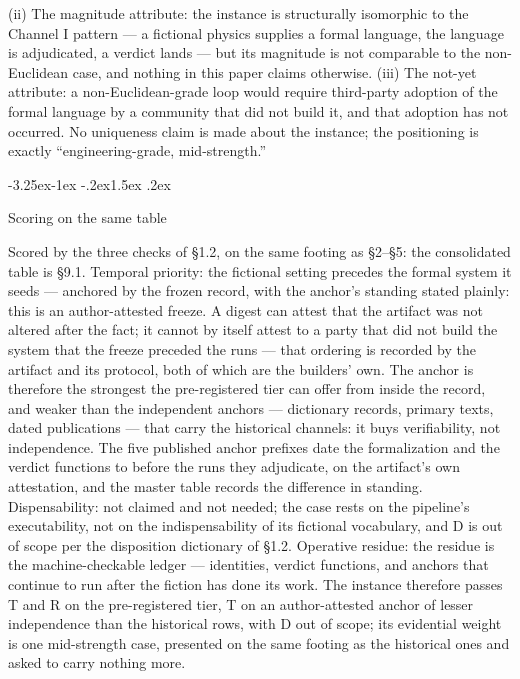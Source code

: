 \documentclass[11pt,a4paper]{article}
\makeatletter
\renewcommand\subsection{\@startsection{subsection}{2}{\z@}%
  {-3.25ex\@plus -1ex \@minus -.2ex}{1.5ex \@plus .2ex}%
  {\normalfont\large\bfseries\raggedright}}
\makeatother
\begin{document}
(ii) The magnitude attribute: the instance is structurally isomorphic to the Channel I pattern — a fictional physics supplies a formal language, the language is adjudicated, a verdict lands — but its magnitude is not comparable to the non-Euclidean case, and nothing in this paper claims otherwise. (iii) The not-yet attribute: a non-Euclidean-grade loop would require third-party adoption of the formal language by a community that did not build it, and that adoption has not occurred. No uniqueness claim is made about the instance; the positioning is exactly ``engineering-grade, mid-strength.''

\subsection{Scoring on the same table}

Scored by the three checks of §1.2, on the same footing as §2–§5: the consolidated table is §9.1. Temporal priority: the fictional setting precedes the formal system it seeds — anchored by the frozen record, with the anchor's standing stated plainly: this is an author-attested freeze. A digest can attest that the artifact was not altered after the fact; it cannot by itself attest to a party that did not build the system that the freeze preceded the runs — that ordering is recorded by the artifact and its protocol, both of which are the builders' own. The anchor is therefore the strongest the pre-registered tier can offer from inside the record, and weaker than the independent anchors — dictionary records, primary texts, dated publications — that carry the historical channels: it buys verifiability, not independence. The five published anchor prefixes date the formalization and the verdict functions to before the runs they adjudicate, on the artifact's own attestation, and the master table records the difference in standing. Dispensability: not claimed and not needed; the case rests on the pipeline's executability, not on the indispensability of its fictional vocabulary, and D is out of scope per the disposition dictionary of §1.2. Operative residue: the residue is the machine-checkable ledger — identities, verdict functions, and anchors that continue to run after the fiction has done its work. The instance therefore passes T and R on the pre-registered tier, T on an author-attested anchor of lesser independence than the historical rows, with D out of scope; its evidential weight is one mid-strength case, presented on the same footing as the historical ones and asked to carry nothing more.
\end{document}
